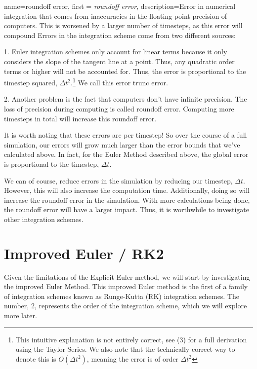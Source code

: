 \documentclass[12pt]{report}
\begin{document}
{
{
    name=roundoff error,
    first = {\textit{roundoff error}},
    description={Error in numerical integration that comes from inaccuracies in the floating point precision of computers. This is worsened by a larger number of timesteps, as this error will compound}
}
Errors in the integration scheme come from two different sources:

1. Euler integration schemes only account for linear terms because it only considers the slope of the tangent line at a point. Thus, any quadratic order terms or higher will not be accounted for. Thus, the error is proportional to the timestep squared, $\Delta t^2$.\footnote{This intuitive explanation is not entirely correct, see (3) for a full derivation using the Taylor Series. We also note that the technically correct way to denote this is $O(\Delta t^2)$, meaning the error is of order $\Delta t^2$} We call this error \gls{trunc error}.

2. Another problem is the fact that computers don’t have infinite precision. The loss of precision during computing is called \gls{roundoff error}. Computing more timesteps in total will increase this \gls{roundoff error}.

It is worth noting that these errors are per timestep! So over the course of a full simulation, our errors will grow much larger than the error bounds that we’ve calculated above. In fact, for the Euler Method described above, the global error is proportional to the timestep, $\Delta t$.

We can of course, reduce errors in the simulation by reducing our timestep, $\Delta t$. However, this will also increase the computation time. Additionally, doing so will increase the \gls{roundoff error} in the simulation. With more calculations being done, the \gls{roundoff error} will have a larger impact. Thus, it is worthwhile to investigate other integration schemes.

\section{Improved Euler / RK2}
Given the limitations of the Explicit Euler method, we will start by investigating the improved Euler Method. This improved Euler method is the first of a family of integration schemes known as Runge-Kutta (RK) integration schemes. The number, 2, represents the order of the integration scheme, which we will explore more later.

}
\end{document}
